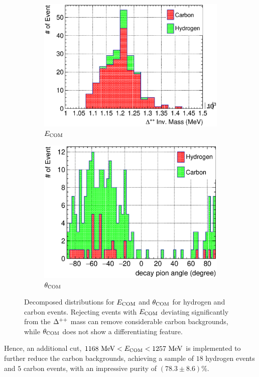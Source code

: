      \begin{figure}
     \begin{subfigure}[b]{\dbfigwid\textwidth}
          \centering
          \includegraphics[width=\textwidth]{figures/perf/tki/SFGpTPCmu_edelta_stack_al14.eps}
          \caption{$E_{\textrm{COM}}$}
          \label{subfig:hsel-com-edelta}
     \end{subfigure}
     \begin{subfigure}[b]{\dbfigwid\textwidth}
          \centering
          \includegraphics[width=\textwidth]{figures/perf/tki/SFGpTPCmu_dang_stack_al15.eps}
          \caption{$\theta_{\textrm{COM}}$}
          \label{subfig:hsel-com-theta}
     \end{subfigure}
     \caption{Decomposed distributions for $E_{\textrm{COM}}$ and $\theta_{\textrm{COM}}$ for hydrogen and carbon events.
     Rejecting events with $E_{\textrm{COM}}$ deviating significantly from the $\Delta^{++}$ mass can remove considerable carbon backgrounds, while $\theta_{\textrm{COM}}$ does not show a differentiating feature.
     }
     \label{fig:hsel-com-decomp}
     \end{figure}
     Hence, an additional cut, $1168~\textrm{MeV}<E_{\textrm{COM}}<1257~\textrm{MeV}$ is implemented to further reduce the carbon backgrounds, achieving a sample of $18$ hydrogen events and $5$ carbon events, with an impressive purity of $(78.3\pm8.6)\%$.

